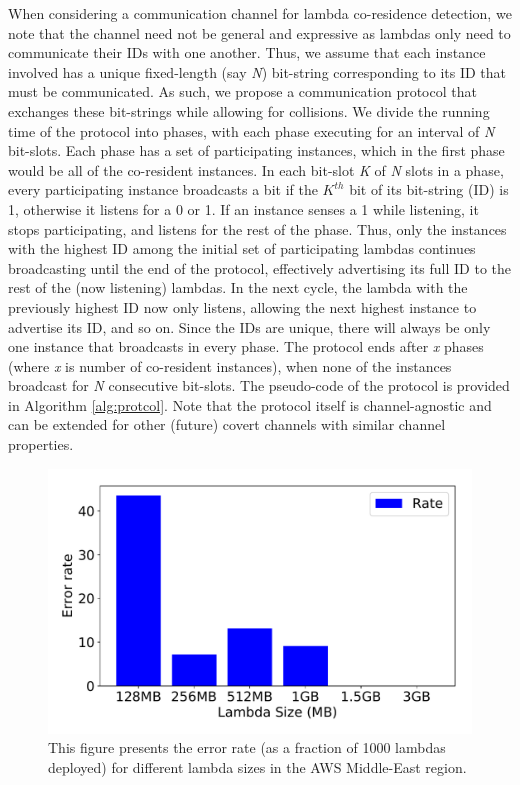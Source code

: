 When considering a communication channel for lambda co-residence detection, we
note that the channel need not be general and expressive as lambdas only need to
communicate their IDs with one another. Thus, we assume that each instance
involved has a unique fixed-length (say \emph{N}) bit-string corresponding to
its ID that must be communicated.  As such, we propose a communication protocol
that exchanges these bit-strings while allowing for collisions. We divide the
running time of the protocol into phases, with each phase executing for an
interval of \textit{N} bit-slots. Each phase has a set of participating
instances, which in the first phase would be all of the co-resident instances. In
each bit-slot \textit{K} of \textit{N} slots in a phase, every participating
instance broadcasts a bit if the $K^{th}$ bit of its bit-string (ID) is 1,
otherwise it listens for a 0 or 1. If an instance senses a 1 while listening, it
stops participating, and listens for the rest of the phase. Thus, only the
instances with the highest ID among the initial set of participating lambdas
continues broadcasting until the end of the protocol, effectively advertising
its full ID to the rest of the (now listening) lambdas. In the next cycle, the
lambda with the previously highest ID now only listens, allowing the next
highest instance to advertise its ID, and so on.  Since the IDs are unique,
there will always be only one instance that broadcasts in every phase. The
protocol ends after \textit{x} phases (where \textit{x} is number of co-resident
instances), when none of the instances broadcast for \textit{N} consecutive
bit-slots. The pseudo-code of the protocol is provided in Algorithm
\ref{alg:protcol}. Note that the protocol itself is channel-agnostic and can be
extended for other (future) covert channels with similar channel properties.

\begin{figure}[!t]
  \includegraphics[width=.99\linewidth]{fig/errorrates.pdf}
  \caption{This figure presents the error rate (as a fraction of 1000 lambdas
  deployed) for different lambda sizes in the AWS Middle-East region. 
\label{fig:errorrates}}
\end{figure}


